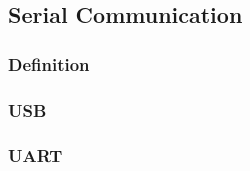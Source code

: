 \subsection{Serial Communication}\label{ssec:serialCommunication}

\subsubsection{Definition}\label{sssec:serialCommunicationDefinition}

\subsubsection{USB}\label{sssec:usb}

\subsubsection{UART}\label{sssec:uart}